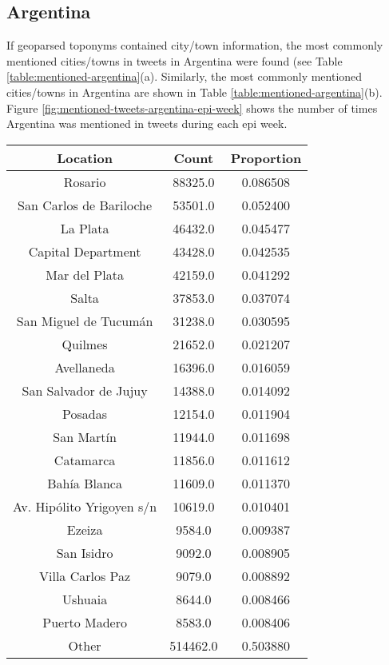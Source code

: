 \subsection{Argentina}

If geoparsed toponyms contained city/town information, the most commonly mentioned cities/towns in tweets in Argentina were found (see Table \ref{table:mentioned-argentina}(a).
Similarly, the most commonly mentioned cities/towns in Argentina are shown in Table \ref{table:mentioned-argentina}(b).
Figure \ref{fig:mentioned-tweets-argentina-epi-week} shows the number of times Argentina was mentioned in tweets during each epi week.

\begin{table}
\centering
\begin{subtable}[c]{0.5\textwidth}
\centering
\begin{tabular}{|c|c|c|}
\hline
    \textbf{Location} & \textbf{Count} & \textbf{Proportion} \\
    \hline
    Rosario & 88325.0 & 0.086508 \\
    San Carlos de Bariloche & 53501.0 & 0.052400 \\
    La Plata & 46432.0 & 0.045477 \\
    Capital Department & 43428.0 & 0.042535 \\
    Mar del Plata & 42159.0 & 0.041292 \\
    Salta & 37853.0 & 0.037074 \\
    San Miguel de Tucumán & 31238.0 & 0.030595 \\
    Quilmes & 21652.0 & 0.021207 \\
    Avellaneda & 16396.0 & 0.016059 \\
    San Salvador de Jujuy & 14388.0 & 0.014092 \\
    Posadas & 12154.0 & 0.011904 \\
    San Martín & 11944.0 & 0.011698 \\
    Catamarca & 11856.0 & 0.011612 \\
    Bahía Blanca & 11609.0 & 0.011370 \\
    Av. Hipólito Yrigoyen s/n & 10619.0 & 0.010401 \\
    Ezeiza & 9584.0 & 0.009387 \\
    San Isidro & 9092.0 & 0.008905 \\
    Villa Carlos Paz & 9079.0 & 0.008892 \\
    Ushuaia & 8644.0 & 0.008466 \\
    Puerto Madero & 8583.0 & 0.008406 \\
    Other & 514462.0 & 0.503880 \\
    \hline
    \end{tabular}
\end{subtable}


\end{table}
